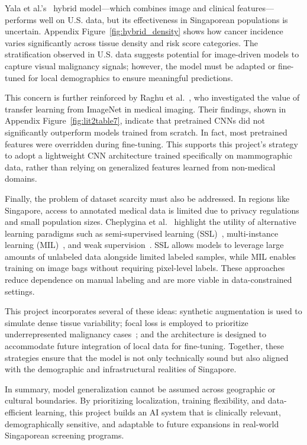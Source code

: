 \documentclass[12pt]{article}
\begin{document}
Yala et al.’s~\cite{1} hybrid model—which combines image and clinical features—performs well on U.S. data, but its effectiveness in Singaporean populations is uncertain. Appendix Figure~\ref{fig:hybrid_density} shows how cancer incidence varies significantly across tissue density and risk score categories. The stratification observed in U.S. data suggests potential for image-driven models to capture visual malignancy signals; however, the model must be adapted or fine-tuned for local demographics to ensure meaningful predictions.

This concern is further reinforced by Raghu et al.~\cite{2}, who investigated the value of transfer learning from ImageNet in medical imaging. Their findings, shown in Appendix Figure~\ref{fig:lit2table7}, indicate that pretrained CNNs did not significantly outperform models trained from scratch. In fact, most pretrained features were overridden during fine-tuning. This supports this project’s strategy to adopt a lightweight CNN architecture trained specifically on mammographic data, rather than relying on generalized features learned from non-medical domains.

Finally, the problem of dataset scarcity must also be addressed. In regions like Singapore, access to annotated medical data is limited due to privacy regulations and small population sizes. Cheplygina et al.~\cite{4} highlight the utility of alternative learning paradigms such as semi-supervised learning (SSL)~\cite{4}, multi-instance learning (MIL)~\cite{4}, and weak supervision~\cite{4}. SSL allows models to leverage large amounts of unlabeled data alongside limited labeled samples, while MIL enables training on image bags without requiring pixel-level labels. These approaches reduce dependence on manual labeling and are more viable in data-constrained settings.

This project incorporates several of these ideas: synthetic augmentation is used to simulate dense tissue variability; focal loss is employed to prioritize underrepresented malignancy cases~\cite{2}; and the architecture is designed to accommodate future integration of local data for fine-tuning. Together, these strategies ensure that the model is not only technically sound but also aligned with the demographic and infrastructural realities of Singapore.

In summary, model generalization cannot be assumed across geographic or cultural boundaries. By prioritizing localization, training flexibility, and data-efficient learning, this project builds an AI system that is clinically relevant, demographically sensitive, and adaptable to future expansions in real-world Singaporean screening programs.
\end{document}
